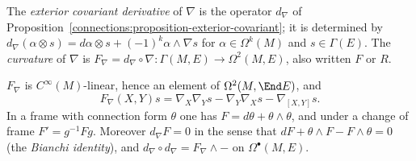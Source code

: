 \begin{definition}\label{connections:definition-curvature}
The \emph{exterior covariant derivative} of $\nabla$ is the operator $d_\nabla$ of Proposition~\ref{connections:proposition-exterior-covariant}; it is determined by
$d_\nabla(\alpha \otimes s) = d\alpha \otimes s + (-1)^k\alpha \wedge \nabla s$ for $\alpha \in \Omega^k(M)$ and $s \in \Gamma(E)$. The \emph{curvature} of $\nabla$ is
$F_\nabla = d_\nabla \circ \nabla \colon \Gamma(M, E) \to \Omega^2(M, E)$, also written $F$ or $R$.
\end{definition}

\begin{proposition}\label{connections:proposition-curvature}
$F_\nabla$ is $C^\infty(M)$-linear, hence an element of $\Omega^2(M, \End E)$, and
\[
F_\nabla(X, Y)s = \nabla_X\nabla_Ys - \nabla_Y\nabla_Xs - \nabla_{[X, Y]}s .
\]
In a frame with connection form $\theta$ one has $F = d\theta + \theta \wedge \theta$, and under a change of frame $F' = g^{-1}Fg$. Moreover $d_\nabla F = 0$ in the sense that
$dF + \theta \wedge F - F \wedge \theta = 0$ (the \emph{Bianchi identity}), and $d_\nabla \circ d_\nabla = F_\nabla \wedge -$ on $\Omega^\bullet(M, E)$.
\end{proposition}

